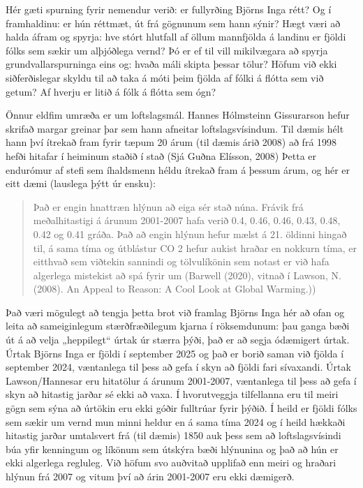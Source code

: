 \documentclass[
  icelandic,
]{book}
\theoremstyle{definition}
\theoremstyle{definition}
\theoremstyle{definition}
\theoremstyle{definition}
\theoremstyle{remark}
\begin{document}
Hér gæti spurning fyrir nemendur verið: er fullyrðing Björns Inga rétt? Og í framhaldinu: er hún réttmæt, út frá gögnunum sem hann sýnir? Hægt væri að halda áfram og spyrja: hve stórt hlutfall af öllum mannfjölda á landinu er fjöldi fólks sem sækir um alþjóðlega vernd? Þó er ef til vill mikilvægara að spyrja grundvallarspurninga eins og: hvaða máli skipta þessar tölur? Höfum við ekki siðferðislegar skyldu til að taka á móti þeim fjölda af fólki á flótta sem við getum? Af hverju er litið á fólk á flótta sem ógn?

Önnur eldfim umræða er um loftslagsmál. Hannes Hólmsteinn Gissurarson hefur skrifað margar greinar þar sem hann afneitar loftslagsvísindum. Til dæmis hélt hann því ítrekað fram fyrir tæpum 20 árum (til dæmis árið 2008) að frá 1998 hefði hitafar í heiminum staðið í stað (Sjá Guðna Elísson, 2008) Þetta er endurómur af stefi sem íhaldsmenn héldu ítrekað fram á þessum árum, og hér er eitt dæmi (lauslega þýtt úr ensku):

\begin{quote}
Það er engin hnattræn hlýnun að eiga sér stað núna. Frávik frá meðalhitastigi á árunum 2001-2007 hafa verið 0.4, 0.46, 0.46, 0.43, 0.48, 0.42 og 0.41 gráða. Það að engin hlýnun hefur mælst á 21. öldinni hingað til, á sama tíma og útblástur CO 2 hefur aukist hraðar en nokkurn tíma, er eitthvað sem viðtekin sannindi og tölvulíkönin sem notast er við hafa algerlega mistekist að spá fyrir um (Barwell (2020), vitnað í Lawson, N. (2008). An Appeal to Reason: A Cool Look at Global Warming.))
\end{quote}

Það væri mögulegt að tengja þetta brot við framlag Björns Inga hér að ofan og leita að sameiginlegum stærðfræðilegum kjarna í röksemdunum: þau ganga bæði út á að velja „heppilegt`` úrtak úr stærra þýði, það er að segja ódæmigert úrtak. Úrtak Björns Inga er fjöldi í september 2025 og það er borið saman við fjölda í september 2024, væntanlega til þess að gefa í skyn að fjöldi fari sívaxandi. Úrtak Lawson/Hannesar eru hitatölur á árunum 2001-2007, væntanlega til þess að gefa í skyn að hitastig jarðar sé ekki að vaxa. Í hvorutveggja tilfellanna eru til meiri gögn sem sýna að úrtökin eru ekki góðir fulltrúar fyrir þýðið. Í heild er fjöldi fólks sem sækir um vernd mun minni heldur en á sama tíma 2024 og í heild hækkaði hitastig jarðar umtalsvert frá (til dæmis) 1850 auk þess sem að loftslagsvísindi búa yfir kenningum og líkönum sem útskýra bæði hlýnunina og það að hún er ekki algerlega regluleg. Við höfum svo auðvitað upplifað enn meiri og hraðari hlýnun frá 2007 og vitum því að árin 2001-2007 eru ekki dæmigerð.
\end{document}
